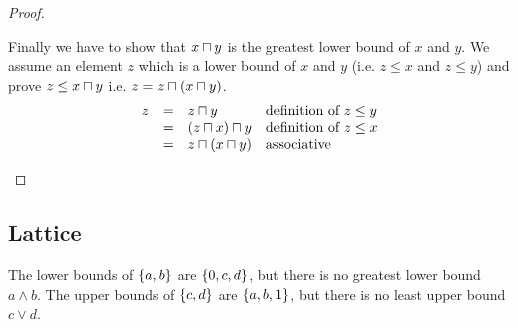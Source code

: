 \begin{definition}
\begin{proof}
\begin{enumerate}
                Finally we have to show that $x \sqcap y$ is the greatest lower
                bound of $x$ and $y$. We assume an element $z$ which is a lower
                bound of $x$ and $y$ (i.e. $z \le x$ and $z \le y$) and prove $z
                \le x \sqcap y$ i.e. $z = z \sqcap (x \sqcap y)$.
                $$
                \begin{array}{lllll} 
                    z
                    &=& z \sqcap y
                    &\text{definition of $z \le y$}
                    \\
                    &=& (z \sqcap x) \sqcap y
                    &\text{definition of $z \le x$}
                    \\
                    &=& z \sqcap (x \sqcap y)
                    &\text{associative}
                 \end{array}
                $$
        \end{enumerate}
    \end{proof}
\end{definition}



\subsection{Lattice}


The lower bounds of $\left\{a,b\right\}$ are $\left\{0,c,d\right\}$, but there is no greatest
lower bound $a \land b$. The upper bounds of $\left\{c,d\right\}$ are $\left\{a,b,1\right\}$, but
there is no least upper bound $c \lor d$.



